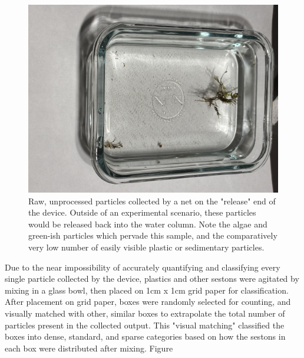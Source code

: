 \documentclass[fleqn,10pt]{SelfArx} %
\begin{document}
	\begin{figure}[h]
		\centering
		\includegraphics[angle=270,origin=c,width=1\linewidth]{Figures/RawReleased}
		\caption[Raw Released Particles]{Raw, unprocessed particles collected by a net on the "release" end of the device. Outside of an experimental scenario, these particles would be released back into the water column. Note the algae and green-ish particles which pervade this sample, and the comparatively very low number of easily visible plastic or sedimentary particles.}
		\label{fig:rawreleased}
	\end{figure}
	\iffalse
	Due to the near impossibility of accurately quantifying and classifying every single particle collected by the device, plastics and other sestons were agitated by mixing in a glass bowl, then placed on 1cm x 1cm grid paper for classification. After placement on grid paper, boxes were randomly selected for counting, and visually matched with other, similar boxes to extrapolate the total number of particles present in the collected output. This "visual matching" classified the boxes into dense, standard, and sparse categories based on how the sestons in each box were distributed after mixing. Figure
\end{document}
